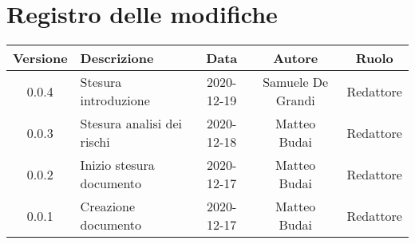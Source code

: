\section*{Registro delle modifiche}

\begin{center}
	\begin{longtable}{|c|p{5cm}|c|c|c|}
	\hline
	\rowcolor{lighter-grayer}
	\textbf{Versione} & \textbf{Descrizione} & \textbf{Data} & \textbf{Autore} & \textbf{Ruolo} \\
	\hline
	\endfirsthead

	0.0.4 & Stesura introduzione & 2020-12-19 & Samuele De Grandi & Redattore \\
	\hline
	0.0.3 & Stesura analisi dei rischi & 2020-12-18 & Matteo Budai & Redattore \\
	\hline
	0.0.2 & Inizio stesura documento & 2020-12-17 & Matteo Budai & Redattore \\
	\hline
	0.0.1 & Creazione documento & 2020-12-17 & Matteo Budai & Redattore \\
	\hline

	\end{longtable}
\end{center}